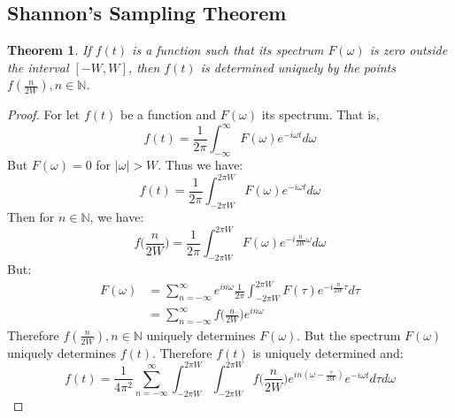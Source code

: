 \documentclass[oneside]{book}
\theoremstyle{mystyle}
\newtheorem{theorem}{Theorem}[section]
\begin{document}
\subsection{Shannon's Sampling Theorem}
\begin{theorem}
If $f(t)$ is a function such that its spectrum $F(\omega)$ is zero outside the interval $[-W,W]$, then $f(t)$ is determined uniquely by the points $f(\frac{n}{2W}), n\in \mathbb{N}$.
\end{theorem}
\begin{proof}
For let $f(t)$ be a function and $F(\omega)$ its spectrum. That is,
\begin{equation*}
f(t) = \frac{1}{2\pi}\int_{-\infty}^{\infty} F(\omega)e^{-i\omega t}d\omega
\end{equation*}
But $F(\omega) = 0$ for $|\omega| > W$. Thus we have:
\begin{equation*}
f(t) = \frac{1}{2\pi}\int_{-2\pi W}^{2\pi W}F(\omega)e^{-i\omega t}d\omega
\end{equation*}
Then for $n\in \mathbb{N}$, we have:
\begin{equation*}
f\big(\frac{n}{2W}\big) = \frac{1}{2\pi}\int_{-2\pi W}^{2\pi W}F(\omega) e^{-i\frac{n}{2W}\omega}d\omega
\end{equation*}
But:
\begin{align*}
F(\omega) &= \sum_{n=-\infty}^{\infty}e^{in\omega}\frac{1}{2\pi}\int_{-2\pi W}^{2\pi W}F(\tau)e^{-i\frac{n}{2W}\tau}d\tau\\
&= \sum_{n=-\infty}^{\infty}f\big(\frac{n}{2W}\big)e^{in\omega}
\end{align*}
Therefore $f(\frac{n}{2W}), n\in \mathbb{N}$ uniquely determines $F(\omega)$. But the spectrum $F(\omega)$ uniquely determines $f(t)$. Therefore $f(t)$ is uniquely determined and:
\begin{equation*}
f(t) = \frac{1}{4\pi^2}\sum_{n=-\infty}^{\infty}\int_{-2\pi W}^{2\pi W}\int_{-2\pi W}^{2\pi W}f\big(\frac{n}{2W}\big)e^{in(\omega-\frac{\tau}{2W})}e^{-i\omega t}d\tau d\omega
\end{equation*}

\end{proof}
\end{document}

